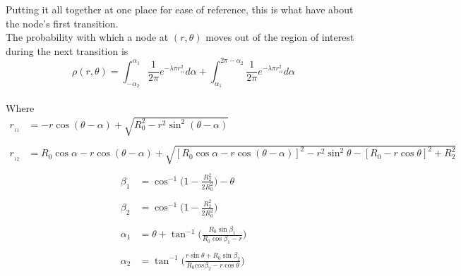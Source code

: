 \newpage
Putting it all together at one place for ease of reference, this is what have about the node's
first transition. \\
The probability with which a 
node at $(r,\theta)$ moves out of the region of interest during the next transition is 
\begin{equation} \label{eq:oneOutProb}
	\rho(r,\theta) = \int_{-\alpha_2}^{\alpha_1} \frac{1}{2\pi} e^{-\lambda \pi r_{\!_{11}}^2} d\alpha +  \int^{2\pi-\alpha_2}_{\alpha_1} \frac{1}{2\pi} e^{-\lambda \pi r_{\!_{12}}^2} d\alpha
\end{equation}
\\
Where
\begin{align*}
	r_{\!_{11}} &= -r\cos(\theta -\alpha) + \sqrt{R_0^2 - r^2\sin^2(\theta - \alpha)} \\
	&\\
	r_{\!_{12}} &= R_0 \cos \alpha - r\cos(\theta - \alpha)  +  \sqrt{[R_0 \cos \alpha - r\cos(\theta-\alpha) ]^2 - r^2\sin^2 \theta - [R_0 - r\cos \theta]^2 + R_2^2} \\
\end{align*}
\begin{align*}
	\beta_1 &= \cos^{-1}\bigg(1-\frac{R_2^2}{2R_0^2}\bigg) - \theta \\
	& \\
		\beta_2 &= \cos^{-1}\bigg(1-\frac{R_2^2}{2R_0^2}\bigg) \\
	& \\
	\alpha_1 &= \theta + \tan^{-1}\bigg( \frac{R_0\sin\beta_1}{R_0\cos\beta_1-r}\bigg)\\
			& \\
			\alpha_2 &= \tan^{-1}\bigg( \frac{r\sin\theta + R_0\sin\beta_2}{R_0cos\beta_2 - r\cos\theta} \bigg)
\end{align*}
